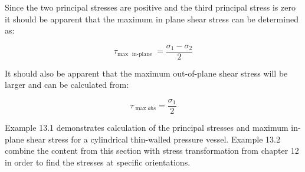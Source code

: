 \documentclass[
  letterpaper,
  DIV=11,
  numbers=noendperiod]{scrreprt}
\begin{document}
Since the two principal stresses are positive and the third principal
stress is zero it should be apparent that the maximum in plane shear
stress can be determined as:

\[
\tau_{\text {max } \text { in-plane }}=\frac{\sigma_1-\sigma_2}{2}
\]

It should also be apparent that the maximum out-of-plane shear stress
will be larger and can be calculated from:

\[
\tau_{\max a b s}=\frac{\sigma_1}{2}
\]

Example 13.1 demonstrates calculation of the principal stresses and
maximum in-plane shear stress for a cylindrical thin-walled pressure
vessel. Example 13.2 combine the content from this section with stress
transformation from chapter 12 in order to find the stresses at specific
orientations.
\end{document}
